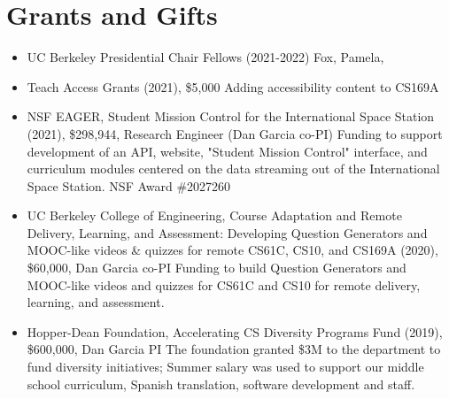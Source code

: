 \section{Grants and Gifts}
\vspace{6pt}

\begin{itemize}

  \setlength\itemsep{1em}

    \item{UC Berkeley Presidential Chair Fellows (2021-2022) Fox, Pamela, \me
    \newline
    }
    
    \item{Teach Access Grants (2021), \$5,000 \me
        \newline
        Adding accessibility content to CS169A
    }
    
    \item{NSF EAGER, Student Mission Control for the International Space Station (2021),
    \$298,944, Research Engineer (Dan Garcia co-PI)
    Funding to support development of an API, website, "Student Mission Control" interface, and curriculum modules centered on the data streaming out of the International Space Station. NSF Award \#2027260}

    \item{UC Berkeley College of Engineering, Course Adaptation and Remote Delivery, Learning, and Assessment: Developing Question Generators and MOOC-like videos \& quizzes for remote CS61C, CS10, and CS169A (2020), \$60,000, Dan Garcia co-PI
    Funding to build Question Generators and MOOC-like videos and quizzes for CS61C and CS10 for remote delivery, learning, and assessment.
    }
    
    \item{Hopper-Dean Foundation, Accelerating CS Diversity Programs Fund (2019), \$600,000, Dan Garcia PI
    The foundation granted \$3M to the department to fund diversity initiatives;  Summer salary was used to support our middle school curriculum, Spanish translation, software development and staff.
    }


\end{itemize}

